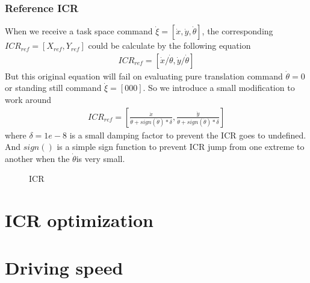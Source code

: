 \subsubsection{Reference ICR}
When we receive a task space command $\dot{\xi}=[\dot{x},\dot{y},\dot{\theta}]$, the corresponding $ICR_{ref}=[X_{ref},Y_{ref}]$ could be calculate by the following equation
\begin{equation}\label{eq:ICR_ref}
    \begin{split}
        ICR_{ref}=[\dot{x}/\dot{\theta},\dot{y}/\dot{\theta}]
    \end{split}
\end{equation}
But this original equation will fail on evaluating pure translation command $\dot{\theta}=0$ or standing still command $\dot{\xi}=[0 0 0]$. So we introduce a small modification to work around
\begin{equation}\label{eq:ICR_refModified}
    \begin{split}
         ICR_{ref}=[\frac{\dot{x}}{\dot{\theta}+sign(\dot{\theta})*\delta} ,\frac{\dot{y}}{\dot{\theta}+sign(\dot{\theta})*\delta}]
    \end{split}
\end{equation}
where $\delta=1e-8$ is a small damping factor to prevent the ICR goes to undefined. And $sign()$ is a simple sign function to prevent ICR jump from one extreme to another when the $\dot{\theta}$is very small.

\begin{figure}[t]
	\begin{center}
	\resizebox{10cm}{!}
    {
		}
	\end{center}
	\caption{ICR}
\end{figure}

\section{ICR optimization}


\section{Driving speed}

